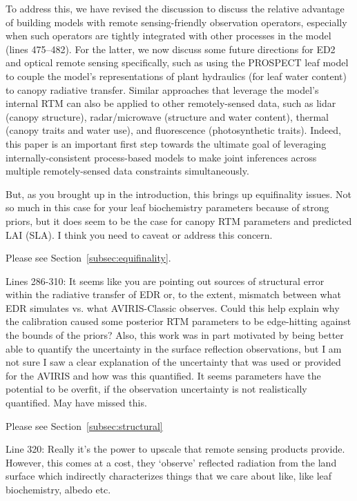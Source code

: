 To address this, we have revised the discussion to discuss the relative advantage of building models with remote sensing-friendly observation operators, especially when such operators are tightly integrated with other processes in the model (lines 475--482).
For the latter, we now discuss some future directions for ED2 and optical remote sensing specifically, such as using the PROSPECT leaf model to couple the model’s representations of plant hydraulics (for leaf water content) to canopy radiative transfer.
Similar approaches that leverage the model’s internal RTM can also be applied to other remotely-sensed data, such as lidar (canopy structure), radar/microwave (structure and water content), thermal (canopy traits and water use), and fluorescence (photosynthetic traits).
Indeed, this paper is an important first step towards the ultimate goal of leveraging internally-consistent process-based models to make joint inferences across multiple remotely-sensed data constraints simultaneously.

\begin{reviewer}
  But, as you brought up in the introduction, this brings up equifinality issues. Not so much in this case for your leaf biochemistry parameters because of strong priors, but it does seem to be the case for canopy RTM parameters and predicted LAI (SLA). I think you need to caveat or address this concern.
\end{reviewer}

Please see Section~\ref{subsec:equifinality}.

\begin{reviewer}
  Lines 286-310: It seems like you are pointing out sources of structural error within the radiative transfer of EDR or, to the extent, mismatch between what EDR simulates vs. what AVIRIS-Classic observes. Could this help explain why the calibration caused some posterior RTM parameters to be edge-hitting against the bounds of the priors? Also, this work was in part motivated by being better able to quantify the uncertainty in the surface reflection observations, but I am not sure I saw a clear explanation of the uncertainty that was used or provided for the AVIRIS and how was this quantified. It seems parameters have the potential to be overfit, if the observation uncertainty is not realistically quantified. May have missed this.
\end{reviewer}

Please see Section~\ref{subsec:structural}

\begin{reviewer}
  Line 320: Really it’s the power to upscale that remote sensing products provide. However, this comes at a cost, they ‘observe’ reflected radiation from the land surface which indirectly characterizes things that we care about like, like leaf biochemistry, albedo etc.
\end{reviewer}

